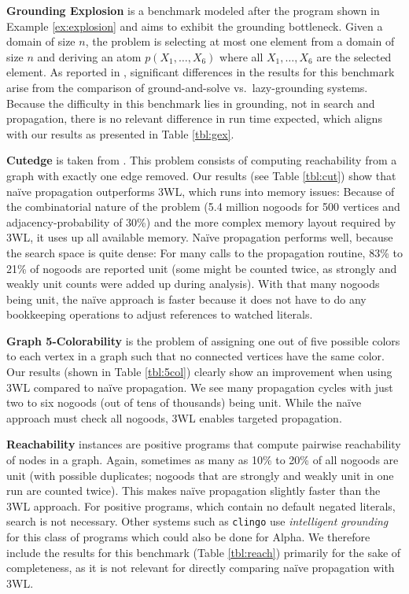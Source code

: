 \documentclass{vutinfth} %
\begin{document}
\begin{description}
\item{\bfseries Grounding Explosion} is a benchmark modeled after the program shown in Example \ref{ex:explosion} and aims to exhibit the grounding bottleneck. Given a domain of size $n$, the problem is selecting at most one element from a domain of size $n$ and deriving an atom $p(X_1, \ldots , X_6)$ where all $X_1, \ldots , X_6$ are the selected element.
As reported in \cite{alpha-techniques}, significant differences in the results for this benchmark arise from the comparison of ground-and-solve vs.~lazy-grounding systems. Because the difficulty in this benchmark lies in grounding, not in search and propagation, there is no relevant difference in run time expected, which aligns with our results as presented in Table \ref{tbl:gex}.

\item{\bfseries Cutedge} is taken from \cite[Example 1]{omiga}. This problem consists of computing reachability from a graph with exactly one edge removed.
Our results (see Table \ref{tbl:cut}) show that na\"{i}ve propagation outperforms 3WL, which runs into memory issues: Because of the combinatorial nature of the problem (5.4 million nogoods for 500 vertices and adjacency-probability of 30\%) and the more complex memory layout required by 3WL, it uses up all available memory. Na\"{i}ve propagation performs well, because the search space is quite dense: For many calls to the propagation routine, 83\% to 21\% of nogoods are reported unit (some might be counted twice, as strongly and weakly unit counts were added up during analysis). With that many nogoods being unit, the na\"{i}ve approach is faster because it does not have to do any bookkeeping operations to adjust references to watched literals.

\item{\bfseries Graph 5-Colorability} is the problem of assigning one out of five possible colors to each vertex in a graph such that no connected vertices have the same color. Our results (shown in Table \ref{tbl:5col}) clearly show an improvement when using 3WL compared to na\"{i}ve propagation. We see many propagation cycles with just two to six nogoods (out of tens of thousands) being unit. While the na\"{i}ve approach must check all nogoods, 3WL enables targeted propagation.

\item{\bfseries Reachability} instances are positive programs that compute pairwise reachability of nodes in a graph. Again, sometimes as many as 10\% to 20\% of all nogoods are unit (with possible duplicates; nogoods that are strongly and weakly unit in one run are counted twice). This makes na\"{i}ve propagation slightly faster than the 3WL approach.
For positive programs, which contain no default negated literals, search is not necessary. Other systems such as \texttt{clingo} use \emph{intelligent grounding} for this class of programs which could also be done for Alpha. We therefore include the results for this benchmark (Table \ref{tbl:reach}) primarily for the sake of completeness, as it is not relevant for directly comparing na\"{i}ve propagation with 3WL.
\end{description}
\end{document}
